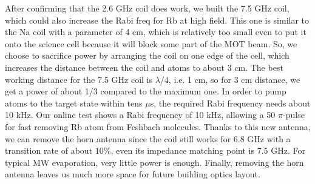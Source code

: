 After confirming that the 2.6 GHz coil does work, we built the 7.5 GHz coil, which could also increase the Rabi freq for Rb at high field. This one is similar to the Na coil with a parameter of 4 cm, which is relatively too small even to put it onto the science cell because it will block some part of the MOT beam. So, we choose to sacrifice power by arranging the coil on one edge of the cell, which increases the distance between the coil and atoms to about 3 cm. The best working distance for the 7.5 GHz coil is \(\lambda/4\), i.e. 1 cm, so for 3 cm distance, we get a power of about 1/3 compared to the maximum one. In order to pump atoms to the target state within tens $\mu$s, the required Rabi frequency needs about 10 kHz. Our online test shows a Rabi frequency of 10 kHz, allowing a 50 $\pi$-pulse for fast removing Rb atom from Feshbach molecules. Thanks to this new antenna, we can remove the horn antenna since the coil still works for 6.8 GHz with a transition rate of about \(10\%\), even its impedance matching point is 7.5 GHz. For typical MW evaporation, very little power is enough. Finally, removing the horn antenna leaves us much more space for future building optics layout.